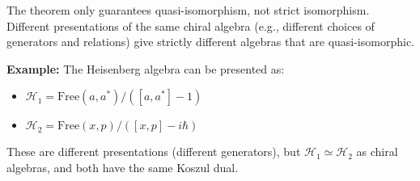 \begin{remark}\label{rem:non-uniqueness-strict}
The theorem only guarantees quasi-isomorphism, not strict isomorphism. Different 
presentations of the same chiral algebra (e.g., different choices of generators 
and relations) give strictly different algebras that are quasi-isomorphic.

\textbf{Example:} The Heisenberg algebra can be presented as:
\begin{itemize}
\item $\mathcal{H}_1 = \text{Free}(a, a^*) / ([a, a^*] - 1)$
\item $\mathcal{H}_2 = \text{Free}(x, p) / ([x, p] - i\hbar)$
\end{itemize}

These are different presentations (different generators), but $\mathcal{H}_1 \simeq \mathcal{H}_2$ 
as chiral algebras, and both have the same Koszul dual.
\end{remark}

